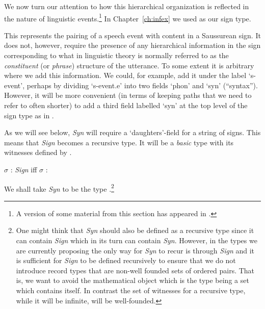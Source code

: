 We now turn our attention to how this hierarchical organization is
reflected in the nature of linguistic events.\footnote{A version of
  some material from this section has appeared in \cite{Cooper2014}.}  In
Chapter~\ref{ch:infex} we used \nexteg{} as our sign type.
\begin{ex} 
\end{ex} 
This represents the pairing of a speech event with content in a
Saussurean sign.  It does not, however, require the presence of any
hierarchical information in the sign corresponding to what in
linguistic theory is normally referred to as the \textit{constituent} (or
\textit{phrase}) structure of the utterance.  To some extent it is
arbitrary where we add this information.  We could, for example, add
it under the label `s-event', perhaps by dividing `s-event.e' into two
fields `phon' and `syn' (``syntax'').  However, it will be more
convenient (in terms of keeping paths that we need to refer to often
shorter) to add a third field labelled `syn' at the top level of the
sign type as in \nexteg{}.
\begin{ex} 
\end{ex}
As we will see below, \textit{Syn} will require a
`daughters'-field for a string of signs.  This means that
\textit{Sign} becomes a recursive type.  It will be a \textit{basic}
type with its witnesses defined by \nexteg{}.
\begin{ex} 
$\sigma$ : \textit{Sign} iff $\sigma$ :   
\end{ex} 
We shall take \textit{Syn} to be the type \nexteg{}.\footnote{One
  might think that \textit{Syn} should also be defined as a recursive
  type since it can contain \textit{Sign} which in its turn can
  contain \textit{Syn}.  However, in the types we are currently
  proposing the only way for \textit{Syn} to recur is through
  \textit{Sign} and it is sufficient for \textit{Sign} to
  be defined recursively to ensure that we do not introduce record
  types that are non-well founded sets of ordered pairs.  That is, we
  want to avoid the mathematical object which is the type being a set
  which contains itself.  In contrast the set of witnesses for
  a recursive type, while it will be infinite, will be well-founded.}
\begin{ex} 
\end{ex}

